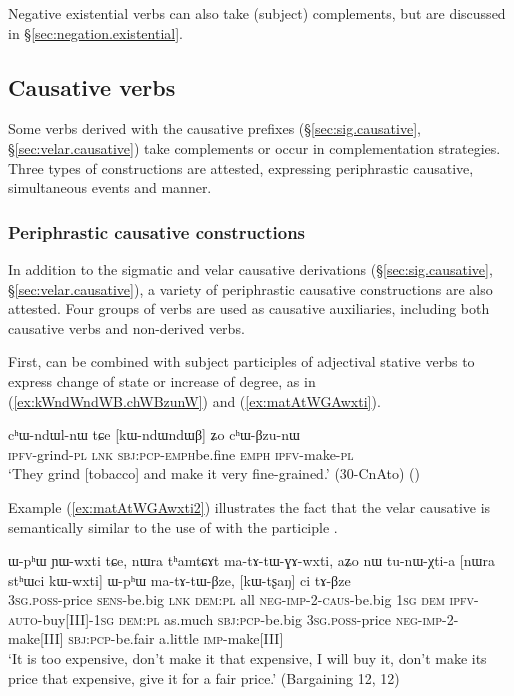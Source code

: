 Negative existential verbs can also take (subject) complements, but are discussed in §\ref{sec:negation.existential}. 

\subsection{Causative verbs}
Some verbs derived with the causative prefixes (§\ref{sec:sig.causative}, §\ref{sec:velar.causative}) take complements or occur in complementation strategies. Three types of constructions are attested, expressing periphrastic causative, simultaneous events and manner.

\subsubsection{Periphrastic causative constructions} \label{sec:sWpa.sABzu}
In addition to the sigmatic and velar causative derivations (§\ref{sec:sig.causative}, §\ref{sec:velar.causative}), a variety of periphrastic causative constructions are also attested. Four groups of verbs are used as causative auxiliaries, including both causative verbs and non-derived verbs.

First,  can be combined with subject participles of adjectival stative verbs to express change of state or increase of degree, as in (\ref{ex:kWndWndWB.chWBzunW}) and (\ref{ex:matAtWGAwxti}).

\begin{exe}
\ex  \label{ex:kWndWndWB.chWBzunW}
\gll cʰɯ-ndɯl-nɯ tɕe [kɯ-ndɯ\redp{}ndɯβ] ʑo cʰɯ-βzu-nɯ \\
\textsc{ipfv}-grind-\textsc{pl} \textsc{lnk} \textsc{sbj}:\textsc{pcp}-\textsc{emph}\redp{}be.fine \textsc{emph} \textsc{ipfv}-make-\textsc{pl} \\
\glt `They grind [tobacco] and make it very fine-grained.' (30-CnAto)
()
\end{exe}

Example (\ref{ex:matAtWGAwxti2}) illustrates the fact that the velar causative  is semantically similar to the use of  with the participle .

\begin{exe}
\ex  \label{ex:matAtWGAwxti2}
\gll  ɯ-pʰɯ ɲɯ-wxti tɕe, nɯra tʰamtɕɤt ma-tɤ-tɯ-ɣɤ-wxti, aʑo nɯ tu-nɯ-χti-a [nɯra stʰɯci kɯ-wxti] ɯ-pʰɯ ma-tɤ-tɯ-βze, [kɯ-tʂaŋ] ci tɤ-βze \\
   \textsc{3sg}.\textsc{poss}-price \textsc{sens}-be.big \textsc{lnk} \textsc{dem}:\textsc{pl} all \textsc{neg}-\textsc{imp}-2-\textsc{caus}-be.big \textsc{1sg} \textsc{dem} \textsc{ipfv}-\textsc{auto}-buy[III]-\textsc{1sg}   \textsc{dem}:\textsc{pl} as.much \textsc{sbj}:\textsc{pcp}-be.big \textsc{3sg}.\textsc{poss}-price \textsc{neg}-\textsc{imp}-2-make[III] \textsc{sbj}:\textsc{pcp}-be.fair a.little \textsc{imp}-make[III] \\
\glt `It is too expensive, don't make it that expensive, I will buy it, don't make its price that expensive, give it for a fair price.' (Bargaining 12,  12)
\end{exe}

